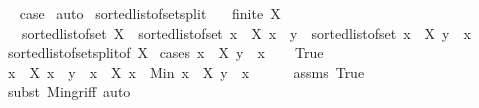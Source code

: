 \begin{isabellebody}
\ \isamarkupfalse%
\ {\isacharquery}{\kern0pt}case\isacommand{{\isachardot}{\kern0pt}}\isamarkupfalse%
\isanewline
{}\isamarkupfalse%
\ auto%
\endisatagproof
{\isafoldproof}%
%
\isadelimproof
\isanewline
%
\endisadelimproof
\isanewline
{}\isamarkupfalse%
\ sorted{\isacharunderscore}{\kern0pt}list{\isacharunderscore}{\kern0pt}of{\isacharunderscore}{\kern0pt}set{\isacharunderscore}{\kern0pt}split{\isacharprime}{\kern0pt}{\isacharcolon}{\kern0pt}\isanewline
\ \ \ {\isachardoublequoteopen}finite\ X{\isachardoublequoteclose}\isanewline
\ \ \ {\isachardoublequoteopen}sorted{\isacharunderscore}{\kern0pt}list{\isacharunderscore}{\kern0pt}of{\isacharunderscore}{\kern0pt}set\ X\ {\isacharequal}{\kern0pt}\ sorted{\isacharunderscore}{\kern0pt}list{\isacharunderscore}{\kern0pt}of{\isacharunderscore}{\kern0pt}set\ {\isacharbraceleft}{\kern0pt}x\ {\isasymin}\ X{\isachardot}{\kern0pt}\ x\ {\isasymle}\ y{\isacharbraceright}{\kern0pt}\ {\isacharat}{\kern0pt}\ sorted{\isacharunderscore}{\kern0pt}list{\isacharunderscore}{\kern0pt}of{\isacharunderscore}{\kern0pt}set\ {\isacharbraceleft}{\kern0pt}x\ {\isasymin}\ X{\isachardot}{\kern0pt}\ y\ {\isacharless}{\kern0pt}\ x{\isacharbraceright}{\kern0pt}{\isachardoublequoteclose}\isanewline
%
\isadelimproof
\ \ %
\endisadelimproof
%
\isatagproof
{}\isamarkupfalse%
\ sorted{\isacharunderscore}{\kern0pt}list{\isacharunderscore}{\kern0pt}of{\isacharunderscore}{\kern0pt}set{\isacharunderscore}{\kern0pt}split{\isacharbrackleft}{\kern0pt}of\ X{\isacharbrackright}{\kern0pt}\isanewline
{}\isamarkupfalse%
\ {\isacharparenleft}{\kern0pt}cases\ {\isachardoublequoteopen}{\isasymexists}x\ {\isasymin}\ X{\isachardot}{\kern0pt}\ y\ {\isacharless}{\kern0pt}\ x{\isachardoublequoteclose}{\isacharparenright}{\kern0pt}\isanewline
\ \ \isamarkupfalse%
\ True\isanewline
\ \ \isamarkupfalse%
\ {\isachardoublequoteopen}{\isacharbraceleft}{\kern0pt}x\ {\isasymin}\ X{\isachardot}{\kern0pt}\ x\ {\isasymle}\ y{\isacharbraceright}{\kern0pt}\ {\isacharequal}{\kern0pt}\ {\isacharbraceleft}{\kern0pt}x\ {\isasymin}\ X{\isachardot}{\kern0pt}\ x\ {\isacharless}{\kern0pt}\ Min\ {\isacharbraceleft}{\kern0pt}x\ {\isasymin}\ X{\isachardot}{\kern0pt}\ y\ {\isacharless}{\kern0pt}\ x{\isacharbraceright}{\kern0pt}{\isacharbraceright}{\kern0pt}{\isachardoublequoteclose}\isanewline
\ \ \ \ \isamarkupfalse%
\ assms\ True\ \isamarkupfalse%
\ {\isacharparenleft}{\kern0pt}subst\ Min{\isacharunderscore}{\kern0pt}gr{\isacharunderscore}{\kern0pt}iff{\isacharparenright}{\kern0pt}\ auto\isanewline

\end{isabellebody}
